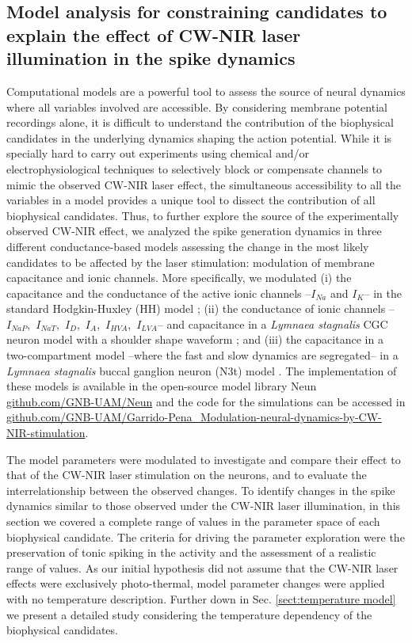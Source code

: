 \subsection{Model analysis for constraining candidates to explain the effect of CW-NIR laser illumination in the spike dynamics}
\label{sect:models}
Computational models are a powerful tool to assess the source of neural dynamics where all variables involved are accessible. By considering membrane potential recordings alone, it is difficult to understand the contribution of the biophysical candidates in the underlying dynamics shaping the action potential. While it is specially hard to carry out experiments using chemical and/or electrophysiological techniques to selectively block or compensate channels to mimic the observed CW-NIR laser effect, the simultaneous accessibility to all the variables in a model provides a unique tool to dissect the contribution of all biophysical candidates. Thus, to further explore the source of the experimentally observed CW-NIR effect, we analyzed the spike generation dynamics in three different conductance-based models assessing the change in the most likely candidates to be affected by the laser stimulation: modulation of membrane capacitance and ionic channels. More specifically, we modulated (i) the capacitance and the conductance of the active ionic channels --$I_{Na}$ and $I_{K}$-- in the standard Hodgkin-Huxley (HH) model \parencite{HODGKIN1952}; (ii) the conductance of ionic channels --$I_{NaP}$,~$I_{NaT}$,~$I_{D}$,~$I_{A}$,~$I_{HVA}$,~$I_{LVA}$-- and capacitance in a \textit{Lymnaea stagnalis} CGC neuron model with a shoulder shape waveform \parencite{vavoulis_balanced_2010}; and (iii) the capacitance in a two-compartment model --where the fast and slow dynamics are segregated-- in a \textit{Lymnaea stagnalis} buccal ganglion neuron (N3t) model \parencite{Vavoulis2007}. The implementation of these models is available in the open-source model library Neun \href{https://github.com/GNB-UAM/neun}{github.com/GNB-UAM/Neun} and the code for the simulations can be accessed in \href{https://github.com/GNB-UAM/Garrido-Pena_Modulation-neural-dynamics-by-CW-NIR-stimulation}{github.com/GNB-UAM/Garrido-Pena\_Modulation-neural-dynamics-by-CW-NIR-stimulation}.

The model parameters were modulated to investigate and compare their effect to that of the CW-NIR laser stimulation on the neurons, and to evaluate the interrelationship between the observed changes. To identify changes in the spike dynamics similar to those observed under the CW-NIR laser illumination, in this section we covered a complete range of values in the parameter space of each biophysical candidate. The criteria for driving the parameter exploration were the preservation of tonic spiking in the activity and the assessment of a realistic range of values.
As our initial hypothesis did not assume that the CW-NIR laser effects were exclusively photo-thermal, model parameter changes were applied with no temperature description. Further down in Sec. \ref{sect:temperature model} we present a detailed study considering the temperature dependency of the biophysical candidates. 

